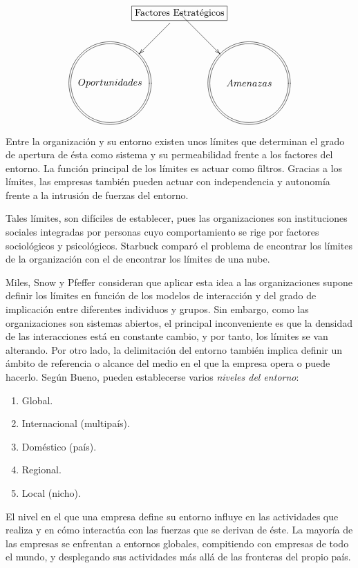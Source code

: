 \documentclass[10pt,a4paper,spanish]{report}
\begin{document}
            \[\xygraph{
            [] *+[F]+[o]{\text{Factores Estratégicos}}
            :[ddll] *+=[o]=<30mm>[F=]{Oportunidades}
            ,:[ddrr] *+=[o]=<30mm>[F=]{Amenazas}
            }\]

            Entre la organización y su entorno existen unos límites que determinan el grado de apertura de ésta como sistema y su permeabilidad frente a los factores del entorno. La función principal de los límites es actuar como filtros. Gracias a los límites, las empresas también pueden actuar con independencia y autonomía frente a la intrusión de fuerzas del entorno.

            Tales límites, son difíciles de establecer, pues las organizaciones son instituciones sociales integradas por personas cuyo comportamiento se rige por factores sociológicos y psicológicos. Starbuck comparó el problema de encontrar los límites de la organización con el de encontrar los límites de una nube.

            Miles, Snow y Pfeffer consideran que aplicar esta idea a las organizaciones supone definir los límites en función de los modelos de interacción y del grado de implicación entre diferentes individuos y grupos. Sin embargo, como las organizaciones son sistemas abiertos, el principal inconveniente es que la densidad de las interacciones está en constante cambio, y por tanto, los límites se van alterando.
            \newpage
            Por otro lado, la delimitación del entorno también implica definir un ámbito de referencia o alcance del medio en el que la empresa opera o puede hacerlo. Según Bueno, pueden establecerse varios \textit{\textcolor[rgb]{0.3,0.4,0.6}{niveles del entorno}}: 
            \begin{enumerate}
                  \item Global.
                  \item Internacional (multipaís).
                  \item Doméstico (país).
                  \item Regional.
                  \item Local (nicho).
            \end{enumerate}

            El nivel en el que una empresa define su entorno influye en las actividades que realiza y en cómo interactúa con las fuerzas que se derivan de éste. La mayoría de las empresas se enfrentan a entornos globales, compitiendo con empresas de todo el mundo, y desplegando sus actividades más allá de las fronteras del propio país.
\end{document}
